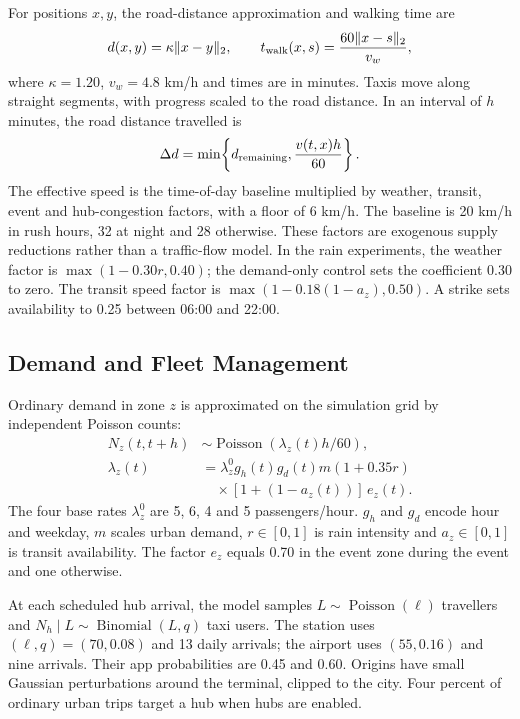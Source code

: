 \documentclass[10pt,twocolumn,letterpaper]{article}
\begin{document}
For positions $x,y$, the road-distance approximation and walking time are
\begin{equation}
 d(x,y)=\kappa\lVert x-y\rVert_2,\qquad
 t_{\rm walk}(x,s)=\frac{60\lVert x-s\rVert_2}{v_w},
 \label{eq:distance}
\end{equation}
where $\kappa=1.20$, $v_w=4.8$ km/h and times are in minutes. Taxis move along
straight segments, with progress scaled to the road distance. In an interval of
$h$ minutes, the road distance travelled is
\begin{equation}
 \Delta d=\min\!\left\{d_{\rm remaining},\frac{v(t,x)h}{60}\right\}.
 \label{eq:movement}
\end{equation}
The effective speed is the time-of-day baseline multiplied by weather,
transit, event and hub-congestion factors, with a floor of 6 km/h. The baseline
is 20 km/h in rush hours, 32 at night and 28 otherwise. These factors are
exogenous supply reductions rather than a traffic-flow model.
In the rain experiments, the weather factor is $\max(1-0.30r,0.40)$;
the demand-only control sets the coefficient 0.30 to zero. The transit speed
factor is $\max(1-0.18(1-a_z),0.50)$. A strike sets availability to 0.25
between 06:00 and 22:00.

\subsection{Demand and Fleet Management}
Ordinary demand in zone $z$ is approximated on the simulation grid by
independent Poisson counts:
\begin{align}
 N_z(t,t+h)&\sim\operatorname{Poisson}\!\left(\lambda_z(t)h/60\right),\label{eq:poisson}\\
 \lambda_z(t)&=\lambda_z^0 g_h(t)g_d(t)m(1+0.35r)\nonumber\\
 &\quad\times[1+(1-a_z(t))]\,e_z(t).\label{eq:rate}
\end{align}
The four base rates $\lambda_z^0$ are 5, 6, 4 and 5 passengers/hour.
$g_h$ and $g_d$ encode hour and weekday, $m$ scales urban demand, $r\in[0,1]$
is rain intensity and $a_z\in[0,1]$ is transit availability. The factor $e_z$
equals 0.70 in the event zone during the event and one otherwise.

At each scheduled hub arrival, the model samples
$L\sim\operatorname{Poisson}(\ell)$ travellers and
$N_h\mid L\sim\operatorname{Binomial}(L,q)$ taxi users. The station uses
$(\ell,q)=(70,0.08)$ and 13 daily arrivals; the airport uses $(55,0.16)$ and
nine arrivals. Their app probabilities are 0.45 and 0.60. Origins have small
Gaussian perturbations around the terminal, clipped to the city. Four percent
of ordinary urban trips target a hub when hubs are enabled.
\end{document}
